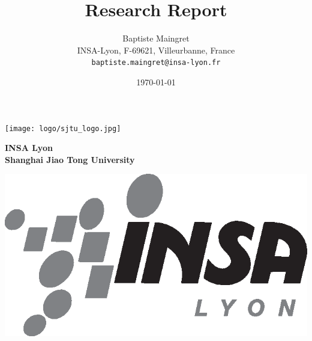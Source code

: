 \documentclass[a4paper]{article}
\begin{document}
\vfill
\begin{minipage}[b]{0.3\columnwidth}
\texttt{[image: logo/sjtu\_logo.jpg]}%
\end{minipage}
\hfill
\begin{minipage}{0.3\columnwidth}
\small
\centering
\textbf{
INSA Lyon \\ %
Shanghai Jiao Tong University
}
\end{minipage}
\hfill
\begin{minipage}[b]{0.25\columnwidth}
\includegraphics[width=\columnwidth]{logo/insa-noir.eps}%
\end{minipage}

\newpage

%
%

\title{Research Report}

\author{Baptiste Maingret\\[10pt]
INSA-Lyon, F-69621, Villeurbanne, France\\
\texttt{baptiste.maingret@insa-lyon.fr}}

\date{\today}
\newcommand{\Keywords}[1]{\par\noindent 
{\small{\em Keywords\/}: Context-Oriented Programming, Golo, Java, System reasoning, Dynamic Language}}
\maketitle
\end{document}
